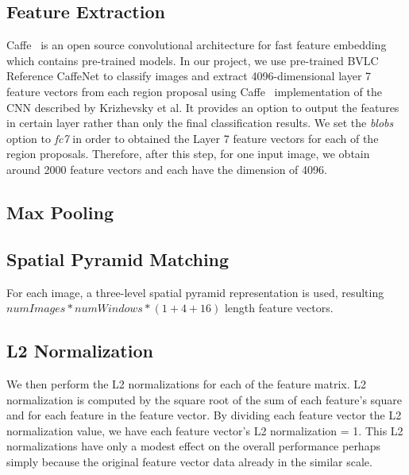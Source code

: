 \subsection{Feature Extraction}
Caffe~\cite{Jia:2014:CCA} is an open source convolutional architecture for
fast feature embedding which contains pre-trained models.
In our project, we use pre-trained BVLC Reference CaffeNet to classify images
and extract 4096-dimensional layer 7 feature vectors from each region
proposal using Caffe~\cite{Jia:2014:CCA} implementation of the CNN described by
Krizhevsky et al\cite{Krizhevsky:2012:ICD}. It provides an option to output the
features in certain layer rather than only the final classification results. We
set the \textit{blobs} option to \textit{fc7} in order to obtained the Layer
7 feature vectors for each of the region proposals. Therefore, after this step,
for one input image, we obtain around 2000 feature vectors and each have the
dimension of 4096.

\subsection{Max Pooling}

\subsection{Spatial Pyramid Matching}
For each image, a three-level spatial pyramid representation is used, resulting
$numImages * numWindows * (1 + 4 + 16)$ length feature vectors.

\subsection{L2 Normalization}
We then perform the L2 normalizations for each of the feature matrix.
L2 normalization is computed by the square root of the sum of each feature's
square and for each feature in the feature vector. By dividing each feature
vector the L2 normalization value, we have each feature vector's
L2 normalization = 1. This L2 normalizations have only a modest effect on the
overall performance perhaps simply because the original feature vector data
already in the similar scale.

